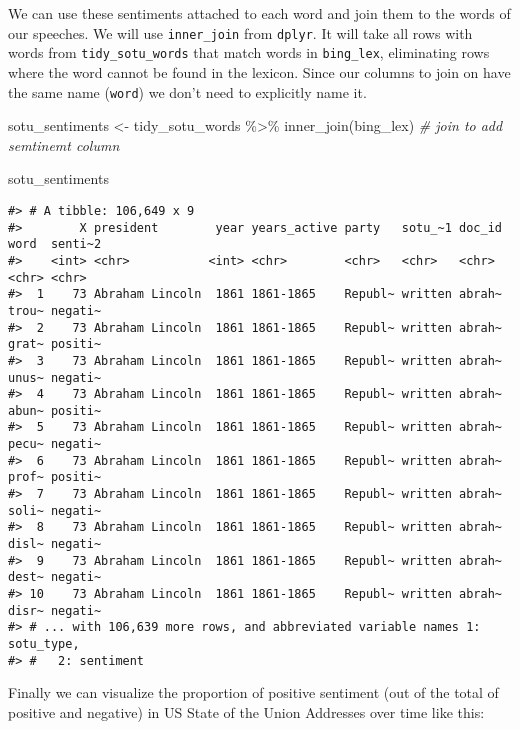 \documentclass[
]{book}
\newenvironment{Shaded}{\begin{snugshade}}{\end{snugshade}}
\newcommand{\CommentTok}[1]{\textcolor[rgb]{0.56,0.35,0.01}{\textit{#1}}}
\newcommand{\FunctionTok}[1]{\textcolor[rgb]{0.00,0.00,0.00}{#1}}
\newcommand{\NormalTok}[1]{#1}
\newcommand{\OtherTok}[1]{\textcolor[rgb]{0.56,0.35,0.01}{#1}}
\newcommand{\SpecialCharTok}[1]{\textcolor[rgb]{0.00,0.00,0.00}{#1}}
\begin{document}
We can use these sentiments attached to each word and join them to the words of our speeches. We will use \texttt{inner\_join} from \texttt{dplyr}. It will take all rows with words from \texttt{tidy\_sotu\_words} that match words in \texttt{bing\_lex}, eliminating rows where the word cannot be found in the lexicon. Since our columns to join on have the same name (\texttt{word}) we don't need to explicitly name it.

\begin{Shaded}
\begin{Highlighting}[]
\NormalTok{sotu\_sentiments }\OtherTok{\textless{}{-}}\NormalTok{ tidy\_sotu\_words }\SpecialCharTok{\%\textgreater{}\%} 
  \FunctionTok{inner\_join}\NormalTok{(bing\_lex)  }\CommentTok{\# join to add semtinemt column}

\NormalTok{sotu\_sentiments}
\end{Highlighting}
\end{Shaded}

\begin{verbatim}
#> # A tibble: 106,649 x 9
#>        X president        year years_active party   sotu_~1 doc_id word  senti~2
#>    <int> <chr>           <int> <chr>        <chr>   <chr>   <chr>  <chr> <chr>  
#>  1    73 Abraham Lincoln  1861 1861-1865    Republ~ written abrah~ trou~ negati~
#>  2    73 Abraham Lincoln  1861 1861-1865    Republ~ written abrah~ grat~ positi~
#>  3    73 Abraham Lincoln  1861 1861-1865    Republ~ written abrah~ unus~ negati~
#>  4    73 Abraham Lincoln  1861 1861-1865    Republ~ written abrah~ abun~ positi~
#>  5    73 Abraham Lincoln  1861 1861-1865    Republ~ written abrah~ pecu~ negati~
#>  6    73 Abraham Lincoln  1861 1861-1865    Republ~ written abrah~ prof~ positi~
#>  7    73 Abraham Lincoln  1861 1861-1865    Republ~ written abrah~ soli~ negati~
#>  8    73 Abraham Lincoln  1861 1861-1865    Republ~ written abrah~ disl~ negati~
#>  9    73 Abraham Lincoln  1861 1861-1865    Republ~ written abrah~ dest~ negati~
#> 10    73 Abraham Lincoln  1861 1861-1865    Republ~ written abrah~ disr~ negati~
#> # ... with 106,639 more rows, and abbreviated variable names 1: sotu_type,
#> #   2: sentiment
\end{verbatim}

Finally we can visualize the proportion of positive sentiment (out of the total of positive and negative) in US State of the Union Addresses over time like this:
\end{document}
